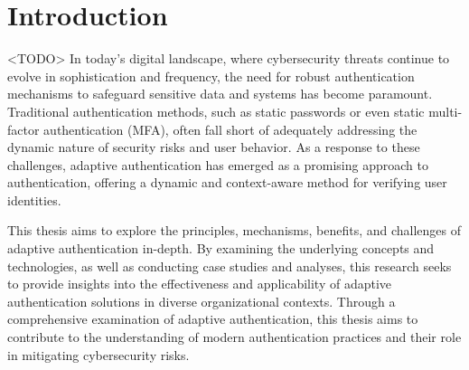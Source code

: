 \documentclass[
  digital,     %
  oneside,     %
  nosansbold,  %
  nocolorbold, %
  lof,         %
  lot,         %
]{fithesis4}
\begin{document}
\chapter*{Introduction}

<TODO>
In today's digital landscape, where cybersecurity threats continue to evolve in sophistication and frequency, the need for robust authentication mechanisms to safeguard sensitive data and systems has become paramount.
Traditional authentication methods, such as static passwords or even static multi-factor authentication (MFA), often fall short of adequately addressing the dynamic nature of security risks and user behavior.
As a response to these challenges, adaptive authentication has emerged as a promising approach to authentication, offering a dynamic and context-aware method for verifying user identities.

This thesis aims to explore the principles, mechanisms, benefits, and challenges of adaptive authentication in-depth.
By examining the underlying concepts and technologies, as well as conducting case studies and analyses, this research seeks to provide insights into the effectiveness and applicability of adaptive authentication solutions in diverse organizational contexts.
Through a comprehensive examination of adaptive authentication, this thesis aims to contribute to the understanding of modern authentication practices and their role in mitigating cybersecurity risks.
\end{document}
